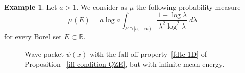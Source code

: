 \documentclass[aip,jmp
]{revtex4}
\newcommand{\RM}{\mathbb{R}}
\theoremstyle{definition}
\newtheorem{example}{Example}
\begin{document}
\begin{example}
\label{ex:part}
Let $a>1$. We consider as $\mu$ the following probability measure
\begin{equation}
\label{eq:muexamp}
\mu(E)= a \log a \int_{E \cap [a, +\infty)} \frac{1+\log \lambda}{\lambda^2 \log^2 \lambda} \; d\lambda
\end{equation}
for every Borel set $E\subset\RM$.


\begin{figure}
\centering
{}
\caption{Wave packet $\psi(x)$ with the fall-off property~\ref{fdtc 1D} of Proposition ~\ref{iff condition QZE}, but with infinite mean energy.}
\label{fig:1}       %
\end{figure}


\end{example}
\end{document}
